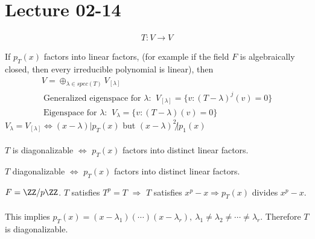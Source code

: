 \documentclass[class=scrartcl, crop=false]{standalone}
\date{2020-02-14}
\begin{document}
\section{Lecture 02-14}

\begin{gather*}
  T: V \to V
\end{gather*} 

If $p_T(x)$ factors into linear factors, (for example if the field $F$ is algebraically closed, then every irreducible polynomial is linear), then 
\begin{gather*}
  V = \oplus_{\lambda \in spec(T)}V_{[\lambda]} \\
  \ \text{Generalized eigenspace for $\lambda$: } \ V_{[\lambda]} = \{v : (T - \lambda)^j(v) = 0\} \\
  \ \text{Eigenspace for $\lambda$: } \ V_\lambda = \{v : (T - \lambda)(v) = 0\}
\end{gather*}  
$V_\lambda = V_{[\lambda]} \Leftrightarrow (x - \lambda) | p_T(x)$  but $(x - \lambda)^2 \not| p_1(x)$
\\\\
$T$ is diagonalizable $\Leftrightarrow$ $p_T(x)$ factors into distinct linear factors.
\begin{theorem}
  $T$ diagonalizable $\Leftrightarrow$ $p_T(x)$ factors into distinct linear factors.
\end{theorem} 
\begin{example}
  $F = \ZZ / p\ZZ$. $T$ satisfies $T^p = T$ $\Rightarrow$ $T$ satisfies $x^p - x \Rightarrow p_T(x)$ divides $x^p - x$.
  \\\\
  This implies $p_T(x) = (x - \lambda_1)(\cdots)(x - \lambda_r), \ \lambda_1 \neq \lambda_2 \neq \cdots \neq \lambda_r$. Therefore $T$ is diagonalizable.
\end{example} 
\end{document}
